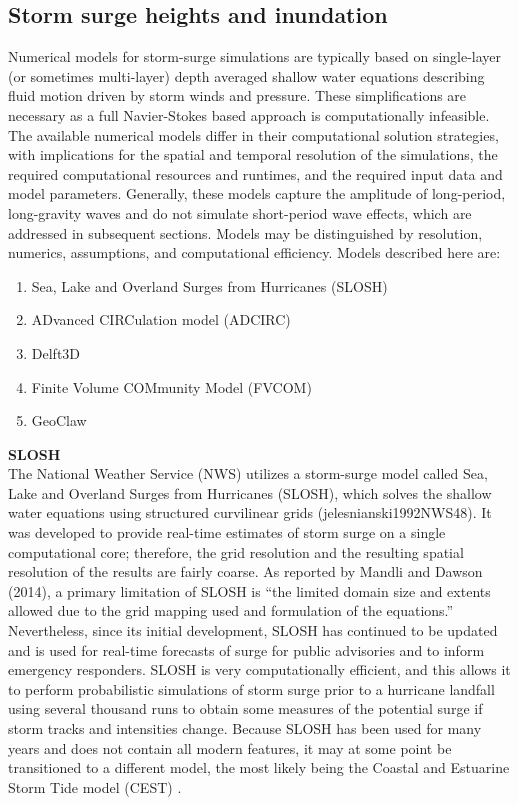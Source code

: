 \subsection{Storm surge heights and inundation}

Numerical models for storm-surge simulations are typically based on single-layer (or sometimes multi-layer) depth averaged shallow water equations describing fluid motion driven by storm winds and pressure. These simplifications are necessary as a full Navier-Stokes based approach is computationally infeasible. The available numerical models differ in their computational solution strategies, with implications for the spatial and temporal resolution of the simulations, the required computational resources and runtimes, and the required input data and model parameters. Generally, these models capture the amplitude of long-period, long-gravity waves and do not simulate short-period wave effects, which are addressed in subsequent sections. Models may be distinguished by resolution, numerics, assumptions, and computational efficiency. Models described here are:

\begin{enumerate}
    \item Sea, Lake and Overland Surges from Hurricanes  (SLOSH)
    \item ADvanced CIRCulation model (ADCIRC)
    \item Delft3D 
    \item Finite Volume COMmunity Model (FVCOM)
    \item GeoClaw
\end{enumerate}

\noindent\textbf{SLOSH} \\The National Weather Service (NWS) utilizes a storm-surge model called Sea, Lake and Overland Surges from Hurricanes (SLOSH), which solves the shallow water equations using structured curvilinear grids (jelesnianski1992NWS48). It was developed to provide real-time estimates of storm surge on a single computational core; therefore, the grid resolution and the resulting spatial resolution of the results are fairly coarse. As reported by Mandli and Dawson (2014), a primary limitation of SLOSH is “the limited domain size and extents allowed due to the grid mapping used and formulation of the equations.” Nevertheless, since its initial development, SLOSH has continued to be updated and is used for real-time forecasts of surge for public advisories and to inform emergency responders. SLOSH is very computationally efficient, and this allows it to perform probabilistic simulations of storm surge prior to a hurricane landfall using several thousand runs to obtain some measures of the potential surge if storm tracks and intensities change. Because SLOSH has been used for many years and does not contain all modern features, it may at some point be transitioned to a different model, the most likely being the Coastal and Estuarine Storm Tide model (CEST) \citep{zhang2017transition}. 
\newline

